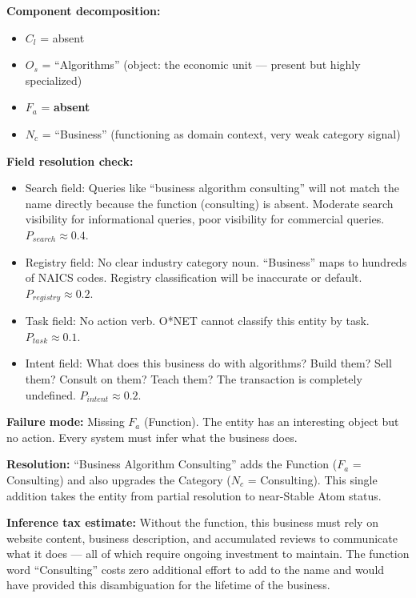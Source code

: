 \documentclass[12pt, openany]{book}
\theoremstyle{thmstyle}
\theoremstyle{defstyle}
\newcommand{\Nc}{N_c}
\newcommand{\Os}{O_s}
\newcommand{\Fa}{F_a}
\newcommand{\Cl}{C_l}
\begin{document}
\begin{examplebox}
\textbf{Component decomposition:}
\begin{itemize}[leftmargin=1.5em]
  \item $\Cl$ = absent
  \item $\Os$ = ``Algorithms'' (object: the economic unit --- present but highly specialized)
  \item $\Fa$ = \textbf{absent}
  \item $\Nc$ = ``Business'' (functioning as domain context, very weak category signal)
\end{itemize}

\textbf{Field resolution check:}
\begin{itemize}[leftmargin=1.5em]
  \item Search field: Queries like ``business algorithm consulting'' will not match the name directly because the function (consulting) is absent. Moderate search visibility for informational queries, poor visibility for commercial queries. $P_{search} \approx 0.4$.
  \item Registry field: No clear industry category noun. ``Business'' maps to hundreds of NAICS codes. Registry classification will be inaccurate or default. $P_{registry} \approx 0.2$.
  \item Task field: No action verb. O*NET cannot classify this entity by task. $P_{task} \approx 0.1$.
  \item Intent field: What does this business do with algorithms? Build them? Sell them? Consult on them? Teach them? The transaction is completely undefined. $P_{intent} \approx 0.2$.
\end{itemize}

\textbf{Failure mode:} Missing $\Fa$ (Function). The entity has an interesting object but no action. Every system must infer what the business does.

\textbf{Resolution:} ``Business Algorithm Consulting'' adds the Function ($\Fa$ = Consulting) and also upgrades the Category ($\Nc$ = Consulting). This single addition takes the entity from partial resolution to near-Stable Atom status.

\textbf{Inference tax estimate:} Without the function, this business must rely on website content, business description, and accumulated reviews to communicate what it does --- all of which require ongoing investment to maintain. The function word ``Consulting'' costs zero additional effort to add to the name and would have provided this disambiguation for the lifetime of the business.
\end{examplebox}
\end{document}
